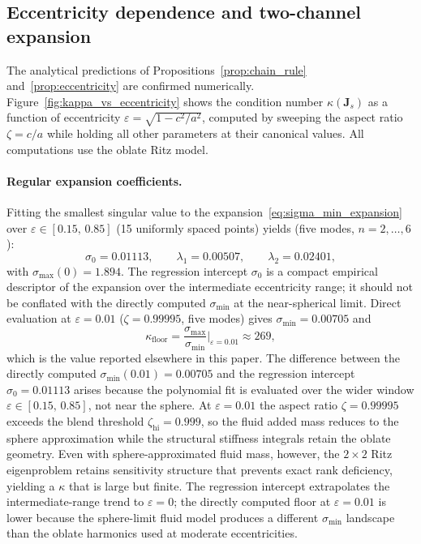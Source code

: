 \subsection{Eccentricity dependence and two-channel expansion}

The analytical predictions of Propositions~\ref{prop:chain_rule}
and~\ref{prop:eccentricity} are confirmed numerically.
Figure~\ref{fig:kappa_vs_eccentricity} shows the condition number
$\kappa(\mathbf{J}_s)$ as a function of eccentricity
$\varepsilon = \sqrt{1 - c^2/a^2}$, computed by sweeping the aspect ratio
$\zeta = c/a$ while holding all other parameters at their canonical values.
All computations use the oblate Ritz model.

\paragraph{Regular expansion coefficients.}
Fitting the smallest singular value to the
expansion~\eqref{eq:sigma_min_expansion} over $\varepsilon\in[0.15,\,0.85]$
(15 uniformly spaced points) yields (five modes,
$n=2,\ldots,6$):
\begin{equation}\label{eq:expansion_coeffs}
  \sigma_0 = 0.01113, \qquad
  \lambda_1 = 0.00507, \qquad
  \lambda_2 = 0.02401,
\end{equation}
with $\sigma_{\max}(0) = 1.894$.  The regression intercept $\sigma_0$ is a
compact empirical descriptor of the expansion over the intermediate
eccentricity range; it should not be conflated with the directly computed
$\sigma_{\min}$ at the near-spherical limit.  Direct evaluation at
$\varepsilon = 0.01$ ($\zeta = 0.99995$, five modes) gives
$\sigma_{\min} = 0.00705$ and
\begin{equation}\label{eq:kappa_floor_direct}
  \kappa_\mathrm{floor}
  = \frac{\sigma_{\max}}{\sigma_{\min}}\bigg|_{\varepsilon=0.01}
  \approx 269,
\end{equation}
which is the value reported elsewhere in this paper.  The difference between
the directly computed $\sigma_{\min}(0.01) = 0.00705$ and the regression
intercept $\sigma_0 = 0.01113$ arises because the polynomial fit is
evaluated over the wider window $\varepsilon\in[0.15,\,0.85]$, not near
the sphere.  At $\varepsilon = 0.01$ the aspect ratio $\zeta = 0.99995$
exceeds the blend threshold $\zeta_\mathrm{hi} = 0.999$, so the fluid added
mass reduces to the sphere approximation while the structural stiffness
integrals retain the oblate geometry.  Even with sphere-approximated fluid mass,
however, the $2\times 2$ Ritz eigenproblem retains sensitivity structure
that prevents exact rank deficiency, yielding a $\kappa$ that is large
but finite.  The regression intercept extrapolates the intermediate-range
trend to $\varepsilon = 0$; the directly computed floor at
$\varepsilon = 0.01$ is lower because the sphere-limit fluid model
produces a different $\sigma_{\min}$ landscape than the oblate harmonics
used at moderate eccentricities.

